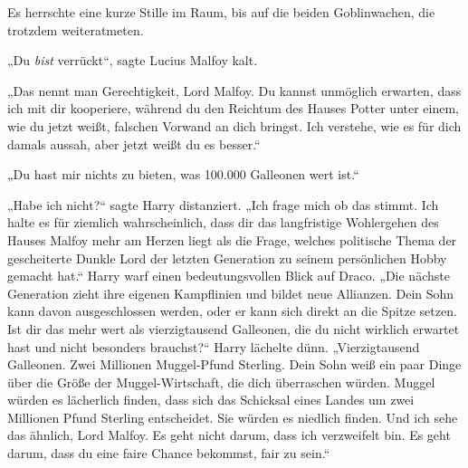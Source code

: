 Es herrschte eine kurze Stille im Raum, bis auf die beiden Goblinwachen, die trotzdem weiteratmeten.

„Du \emph{bist} verrückt“, sagte Lucius Malfoy kalt.

„Das nennt man Gerechtigkeit, Lord Malfoy. Du kannst unmöglich erwarten, dass ich mit dir kooperiere, während du den Reichtum des Hauses Potter unter einem, wie du jetzt weißt, falschen Vorwand an dich bringst. Ich verstehe, wie es für dich damals aussah, aber jetzt weißt du es besser.“

„Du hast mir nichts zu bieten, was 100.000 Galleonen wert ist.“

„Habe ich nicht?“ sagte Harry distanziert.
„Ich frage mich ob das stimmt. Ich halte es für ziemlich wahrscheinlich, dass dir das langfristige Wohlergehen des Hauses Malfoy mehr am Herzen liegt als die Frage, welches politische Thema der gescheiterte Dunkle Lord der letzten Generation zu seinem persönlichen Hobby gemacht hat.“
Harry warf einen bedeutungsvollen Blick auf Draco.
„Die nächste Generation zieht ihre eigenen Kampflinien und bildet neue Allianzen. Dein Sohn kann davon ausgeschlossen werden, oder er kann sich direkt an die Spitze setzen. Ist dir das mehr wert als vierzigtausend Galleonen, die du nicht wirklich erwartet hast und nicht besonders brauchst?“ Harry lächelte dünn.
„Vierzigtausend Galleonen. Zwei Millionen Muggel-Pfund Sterling. Dein Sohn weiß ein paar Dinge über die Größe der Muggel-Wirtschaft, die dich überraschen würden. Muggel würden es lächerlich finden, dass sich das Schicksal eines Landes um zwei Millionen Pfund Sterling entscheidet. Sie würden es niedlich finden. Und ich sehe das ähnlich, Lord Malfoy. Es geht nicht darum, dass ich verzweifelt bin. Es geht darum, dass du eine faire Chance bekommst, fair zu sein.“

